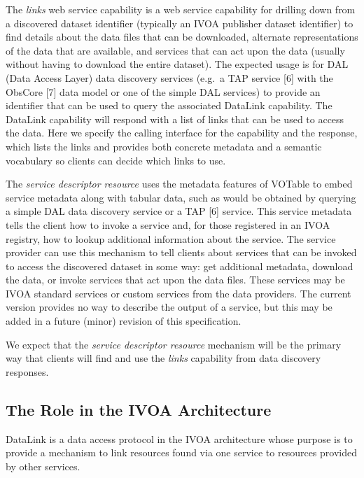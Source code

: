 \documentclass[11pt,a4paper]{ivoa}
\begin{document}
The {\em links\/} web service capability is a web service capability
for drilling
down from a discovered dataset identifier (typically an IVOA publisher
dataset identifier) to find details about the data files that can be
downloaded, alternate representations of the data that are available, and
services that can act upon the data (usually without having to download
the entire dataset). The expected usage is for DAL (Data Access Layer)
data discovery services (e.g.\ a TAP service [6] with the ObsCore [7] data
model or one of the simple DAL services) to provide an identifier that
can be used to query the associated DataLink capability. The DataLink
capability will respond with a list of links that can be used to access
the data. Here we specify the calling interface for the capability and
the response, which lists the links and provides both concrete metadata
and a semantic vocabulary so clients can decide which links to use.

The {\em service descriptor resource\/}
uses the metadata features of VOTable to
embed service metadata along with tabular data, such as would be obtained
by querying a simple DAL data discovery service or a TAP [6] service. This
service metadata tells the client how to invoke a service and, for those
registered in an IVOA registry, how to lookup additional information
about the service. The service provider can use this mechanism to tell
clients about services that can be invoked to access the discovered
dataset in some way: get additional metadata, download the data, or
invoke services that act upon the data files. These services may be
IVOA standard services or custom services from the data providers. The
current version provides no way to describe the output of a service,
but this may be added in a future (minor) revision of this specification.

We expect that the {\em service descriptor resource\/}
mechanism will be the primary way that clients will find and
use the {\em links\/} capability from data discovery
responses.


\subsection{The Role in the IVOA Architecture}

DataLink is a data access protocol in the IVOA architecture whose purpose
is to provide a mechanism to link resources found via one service to
resources provided by other services.
\end{document}
